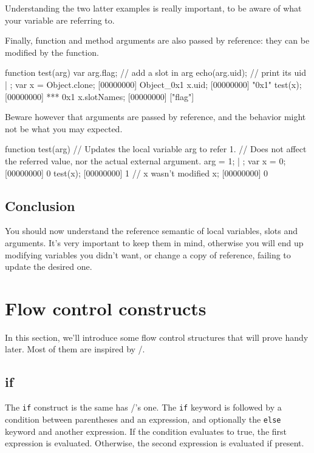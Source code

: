 Understanding the two latter examples is really important, to be aware
of what your variable are referring to.

Finally, function and method arguments are also passed by reference:
they can be modified by the function.

\begin{urbiscript}
function test(arg)
{
  var arg.flag;  // add a slot in arg
  echo(arg.uid); // print its uid
} | {};
var x = Object.clone;
[00000000] Object_0x1
x.uid;
[00000000] "0x1"
test(x);
[00000000] *** 0x1
x.slotNames;
[00000000] ["flag"]
\end{urbiscript}

Beware however that arguments are passed by reference, and the
behavior might not be what you may expected.

\begin{urbiscript}
function test(arg)
{
  // Updates the local variable arg to refer 1.
  // Does not affect the referred value, nor the actual external argument.
  arg = 1;
} | {};
var x = 0;
[00000000] 0
test(x);
[00000000] 1
// x wasn't modified
x;
[00000000] 0
\end{urbiscript}

\section{Conclusion}

You should now understand the reference semantic of local variables,
slots and arguments. It's very important to keep them in mind,
otherwise you will end up modifying variables you didn't want, or
change a copy of reference, failing to update the desired one.

\chapter{Flow control constructs}

In this section, we'll introduce some flow control structures that
will prove handy later. Most of them are inspired by \C/\Cxx.

\section{if}

The \lstinline{if} construct is the same has \C/\Cxx's one. The
\lstinline{if} keyword is followed by a condition between parentheses and
an expression, and optionally the \lstinline{else} keyword and another
expression. If the condition evaluates to true, the first expression
is evaluated. Otherwise, the second expression is evaluated if
present.

